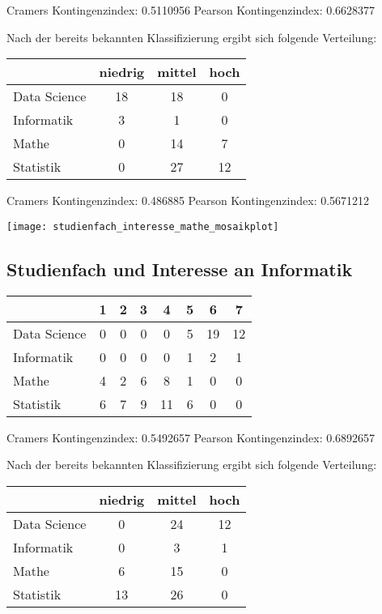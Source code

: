 \documentclass[paper=a4,                 %
               fontsize=12pt,            %
               parskip=half,             %
               ngerman,                 %
               ]{scrartcl}
\begin{document}
Cramers Kontingenzindex:  0.5110956 \newline
Pearson Kontingenzindex:  0.6628377 


Nach der bereits bekannten Klassifizierung ergibt sich folgende Verteilung: \\ \newline
\begin{tabular}{l||c|c|c}
& niedrig & mittel & hoch \\
\hline
Data Science & 18 & 18 & 0\\
Informatik  & 3 & 1 & 0 \\
Mathe     &  0 & 14 & 7  \\
Statistik     &0 & 27 & 12\\
\end{tabular}

Cramers Kontingenzindex:  0.486885 \newline
Pearson Kontingenzindex:  0.5671212 

\texttt{[image: studienfach\_interesse\_mathe\_mosaikplot]}

\subsection{Studienfach und Interesse an Informatik}
\begin{tabular}{l||c|c|c|c|c|c|c}
& 1 & 2 & 3 & 4 & 5 & 6 & 7 \\
\hline
Data Science & 0 & 0 & 0 & 0 & 5 &19 &12 \\
  Informatik   & 0 & 0 & 0 & 0 & 1 & 2 & 1\\
  Mathe        & 4 & 2 & 6 & 8 & 1 & 0 & 0\\
  Statistik    & 6 & 7 & 9 &11 & 6 & 0 & 0\\
\end{tabular}

Cramers Kontingenzindex:  0.5492657 \newline
Pearson Kontingenzindex:  0.6892657 


Nach der bereits bekannten Klassifizierung ergibt sich folgende Verteilung: \\ \newline
\begin{tabular}{l||c|c|c}
& niedrig & mittel & hoch \\
\hline
Data Science & 0 & 24 & 12\\
Informatik  & 0 & 3 & 1 \\
Mathe     &  6 & 15 & 0  \\
Statistik     &13 & 26 & 0\\
\end{tabular}
\end{document}

